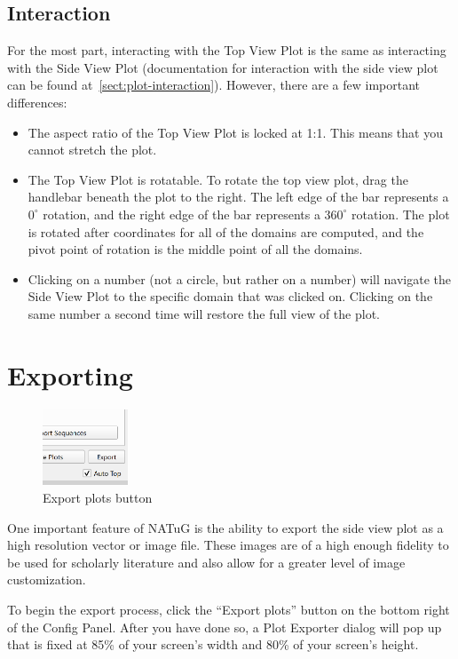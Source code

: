 \documentclass[titlepage]{article}
\begin{document}
\subsection{Interaction}
For the most part, interacting with the Top View Plot is the same as interacting with the Side View Plot (documentation for interaction with the side view plot can be found at~\ref{sect:plot-interaction}). However, there are a few important differences:
\begin{itemize}
	\item The aspect ratio of the Top View Plot is locked at 1:1. This means that you cannot stretch the plot.
	\item The Top View Plot is rotatable. To rotate the top view plot, drag the handlebar beneath the plot to the right. The left edge of the bar represents a $0^{\circ}$ rotation, and the right edge of the bar represents a $360^{\circ}$ rotation. The plot is rotated after coordinates for all of the domains are computed, and the pivot point of rotation is the middle point of all the domains.
	\item Clicking on a number (not a circle, but rather on a number) will navigate the Side View Plot to the specific domain that was clicked on. Clicking on the same number a second time will restore the full view of the plot.
\end{itemize}

\section{Exporting}

\begin{figure} \label{export-plots-button}
	\centering
	\caption{Export plots button}
	\includegraphics[width=1in]{export-plots-button.png}
\end{figure}

One important feature of NATuG is the ability to export the side view plot as a high resolution vector or image file. These images are of a high enough fidelity to be used for scholarly literature and also allow for a greater level of image customization.

To begin the export process, click the ``Export plots'' button on the bottom right of the Config Panel. After you have done so, a Plot Exporter dialog will pop up that is fixed at 85\% of your screen's width and 80\% of your screen's height.
\end{document}
